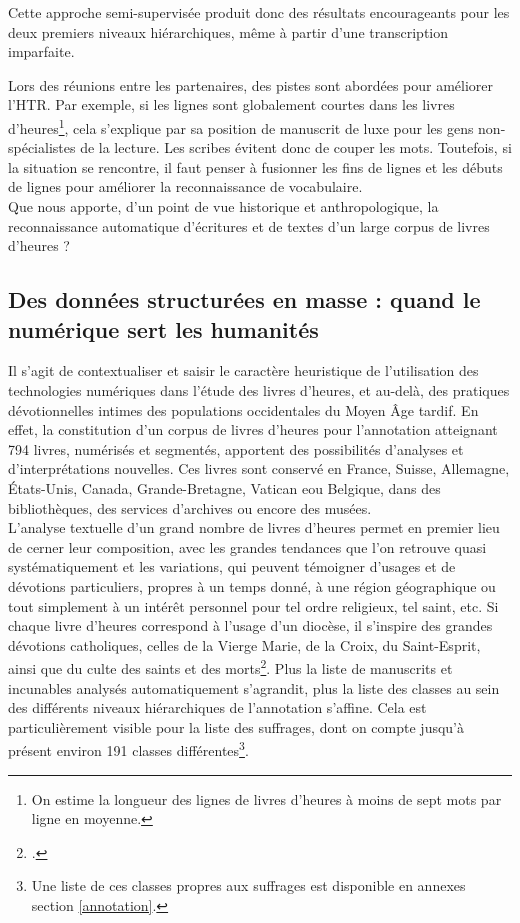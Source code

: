 \documentclass[a4paper,12pt,twoside]{book}
\begin{document}
    Cette approche semi-supervisée produit donc des résultats encourageants pour les deux premiers niveaux hiérarchiques, même à partir d'une transcription imparfaite. 
    
    Lors des réunions entre les partenaires, des pistes sont abordées pour améliorer l'HTR. Par exemple, si les lignes sont globalement courtes dans les livres d’heures\footnote{On estime la longueur des lignes de livres d'heures à moins de sept mots par ligne en moyenne.}, cela s'explique par sa position de manuscrit de luxe pour les gens non-spécialistes de la lecture. Les scribes évitent donc de couper les mots. Toutefois, si la situation se rencontre, il faut penser à fusionner les fins de lignes et les débuts de lignes pour améliorer la reconnaissance de vocabulaire. \\
    
    Que nous apporte, d'un point de vue historique et anthropologique, la reconnaissance automatique d'écritures et de textes d'un large corpus de livres d'heures ?

	
	\subsection{Des données structurées en masse : quand le numérique sert les humanités}
	
	Il s'agit de contextualiser et saisir le caractère heuristique de l'utilisation des technologies numériques dans l'étude des livres d'heures, et au-delà, des pratiques dévotionnelles intimes des populations occidentales du Moyen Âge tardif. En effet, la constitution d'un corpus de livres d'heures pour l'annotation atteignant 794 livres, numérisés et segmentés, apportent des possibilités d'analyses et d'interprétations nouvelles. Ces livres sont conservé en France, Suisse, Allemagne, États-Unis, Canada, Grande-Bretagne, Vatican eou Belgique, dans des bibliothèques, des services d’archives ou encore des musées.\\
	
	L'analyse textuelle d'un grand nombre de livres d'heures permet en premier lieu de cerner leur composition, avec les grandes tendances que l'on retrouve quasi systématiquement et les variations, qui peuvent témoigner d'usages et de dévotions particuliers, propres à un temps donné, à une région géographique ou tout simplement à un intérêt personnel pour tel ordre religieux, tel saint, etc. Si chaque livre d'heures correspond à l'usage d'un diocèse, il s'inspire des grandes dévotions catholiques, celles de la Vierge Marie, de la Croix, du Saint-Esprit, ainsi que du culte des saints et des morts\footcite[p. VII-IX]{Leroquais_notices}. Plus la liste de manuscrits et incunables analysés automatiquement s'agrandit, plus la liste des classes au sein des différents niveaux hiérarchiques de l'annotation s'affine. Cela est particulièrement visible pour la liste des suffrages, dont on compte jusqu'à présent environ 191 classes différentes\footnote{Une liste de ces classes propres aux suffrages est disponible en annexes section \ref{annotation}.}. 
	
\end{document}
